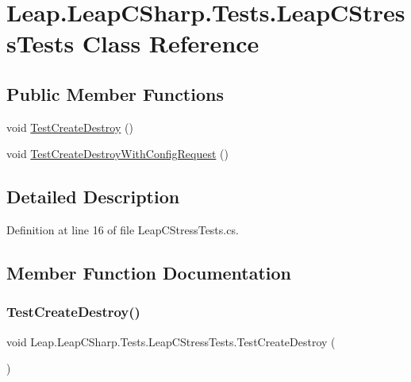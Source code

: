 \hypertarget{class_leap_1_1_leap_c_sharp_1_1_tests_1_1_leap_c_stress_tests}{}\section{Leap.\+Leap\+C\+Sharp.\+Tests.\+Leap\+C\+Stress\+Tests Class Reference}
\label{class_leap_1_1_leap_c_sharp_1_1_tests_1_1_leap_c_stress_tests}
\subsection*{Public Member Functions}
\begin{DoxyCompactItemize}
\item 
void \mbox{\hyperlink{class_leap_1_1_leap_c_sharp_1_1_tests_1_1_leap_c_stress_tests_aec8594426969da1e7334314ac643cb12}{Test\+Create\+Destroy}} ()
\item 
void \mbox{\hyperlink{class_leap_1_1_leap_c_sharp_1_1_tests_1_1_leap_c_stress_tests_afa86838cf9e183af95c0f95d41aea543}{Test\+Create\+Destroy\+With\+Config\+Request}} ()
\end{DoxyCompactItemize}


\subsection{Detailed Description}


Definition at line 16 of file Leap\+C\+Stress\+Tests.\+cs.



\subsection{Member Function Documentation}
\mbox{\label{class_leap_1_1_leap_c_sharp_1_1_tests_1_1_leap_c_stress_tests_aec8594426969da1e7334314ac643cb12}} 
\subsubsection{\texorpdfstring{TestCreateDestroy()}{TestCreateDestroy()}}
{\footnotesize\ttfamily void Leap.\+Leap\+C\+Sharp.\+Tests.\+Leap\+C\+Stress\+Tests.\+Test\+Create\+Destroy (\begin{DoxyParamCaption}{ }\end{DoxyParamCaption})}




